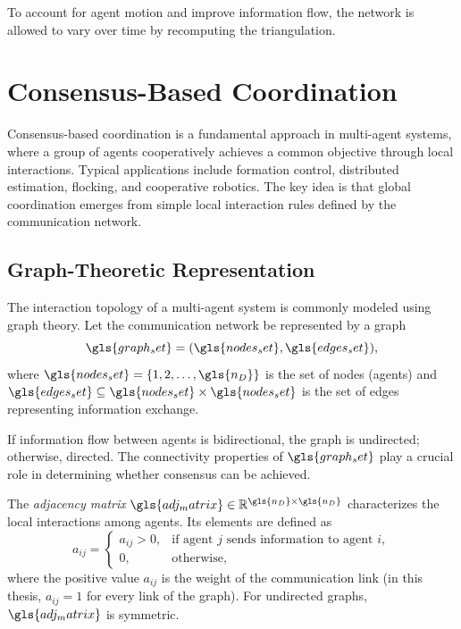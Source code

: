 To account for agent motion and improve information flow, the network is allowed to vary over time by recomputing the triangulation.

\section{Consensus-Based Coordination} \label{sec.3:Consensus-Based Coordination}

Consensus-based coordination is a fundamental approach in multi-agent systems, where a group of agents cooperatively achieves a common objective through local interactions.
Typical applications include formation control, distributed estimation, flocking, and cooperative robotics.
The key idea is that global coordination emerges from simple local interaction rules defined by the communication network.

\subsection{Graph-Theoretic Representation}

The interaction topology of a multi-agent system is commonly modeled using graph theory.
Let the communication network be represented by a graph
\begin{equation}
    \gls{graph_set} = (\gls{nodes_set}, \gls{edges_set}),
\end{equation}
where $\gls{nodes_set} = \{1,2,\dots,\gls{n_D}\}$ is the set of nodes (agents) and $\gls{edges_set} \subseteq \gls{nodes_set} \times \gls{nodes_set}$ is the set of edges representing information exchange.

If information flow between agents is bidirectional, the graph is undirected; otherwise, directed.
The connectivity properties of $\gls{graph_set}$ play a crucial role in determining whether consensus can be achieved.

The \textit{adjacency matrix} $\gls{adj_matrix} \in \mathbb{R}^{\gls{n_D} \times \gls{n_D}}$ characterizes the local interactions among agents.
Its elements are defined as
\begin{equation}
    a_{ij} =
    \begin{cases}
        a_{ij} > 0, & \text{if agent $j$ sends information to agent $i$}, \\
        0, & \text{otherwise},
    \end{cases}
\end{equation}
where the positive value $a_{ij}$ is the weight of the communication link (in this thesis, $a_{ij}=1$ for every link of the graph).
For undirected graphs, $\gls{adj_matrix}$ is symmetric.

